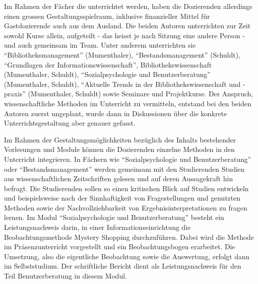 \documentclass[a4paper,
fontsize=11pt,
oneside,
numbers=noperiodatend,
parskip=half-,
bibliography=totoc,
final
]{scrartcl}
\begin{document}
Im Rahmen der Fächer die unterrichtet werden, haben die Dozierenden
allerdings einen grossen Gestaltungsspielraum, inklusive finanzieller
Mittel für Gastdozierende auch aus dem Ausland. Die beiden Autoren
unterrichten zur Zeit sowohl Kurse allein, aufgeteilt - das heisst je
nach Sitzung eine andere Person - und auch gemeinsam im Team. Unter
anderem unterrichten sie \enquote{Bibliotheksmanagement} (Mumenthaler),
\enquote{Bestandsmanagement} (Schuldt), \enquote{Grundlagen der
Informationswissenschaft}, Bibliothekswissenschaft (Mumenthaler,
Schuldt), \enquote{Sozialpsychologie und Benutzerberatung} (Mumenthaler,
Schuldt), \enquote{Aktuelle Trends in der Bibliothekswissenschaft und
-praxis} (Mumenthaler, Schuldt) sowie Seminare und Projektkurse. Der
Anspruch, wissenschaftliche Methoden im Unterricht zu vermitteln,
entstand bei den beiden Autoren zuerst ungeplant, wurde dann in
Diskussionen über die konkrete Unterrichtsgestaltung aber genauer
gefasst.

Im Rahmen der Gestaltungsmöglichkeiten bezüglich des Inhalts bestehender
Vorlesungen und Module können die Dozierenden einzelne Methoden in den
Unterricht integrieren. In Fächern wie \enquote{Sozialpsychologie und
Benutzerberatung} oder \enquote{Bestandsmanagement} werden gemeinsam mit
den Studierenden Studien aus wissenschaftlichen Zeitschriften gelesen
und auf deren Aussagekraft hin befragt. Die Studierenden sollen so einen
kritischen Blick auf Studien entwickeln und beispielsweise nach der
Sinnhaftigkeit von Fragestellungen und genutzten Methoden sowie der
Nachvollziehbarkeit von Ergebnisinterpretationen zu fragen lernen. Im
Modul \enquote{Sozialpsychologie und Benutzerberatung} besteht ein
Leistungsnachweis darin, in einer Informationseinrichtung die
Beobachtungsmethode Mystery Shopping durchzuführen. Dabei wird die
Methode im Präsenzunterricht vorgestellt und ein Beobachtungsbogen
erarbeitet. Die Umsetzung, also die eigentliche Beobachtung sowie die
Auswertung, erfolgt dann im Selbststudium. Der schriftliche Bericht
dient als Leistungsnachweis für den Teil Benutzerberatung in diesem
Modul.
\end{document}
